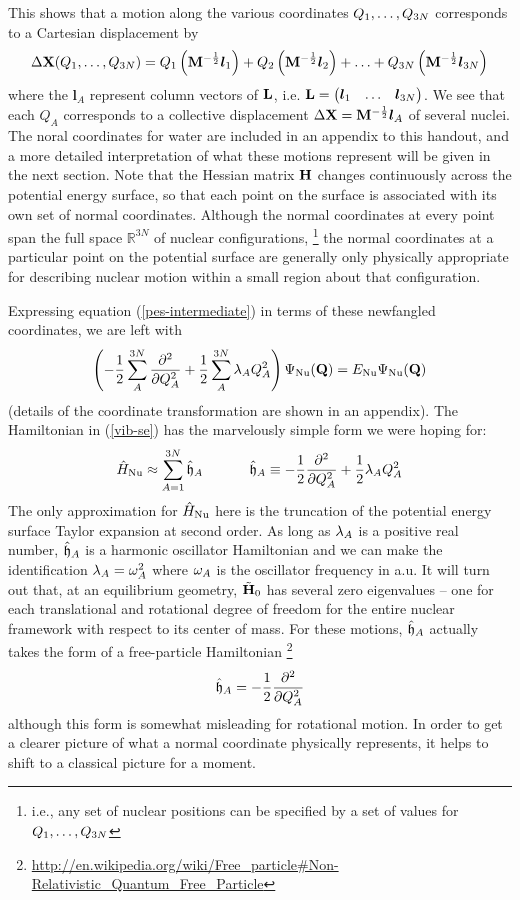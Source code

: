 \documentclass[11pt]{article}
\begin{document}
This shows that a motion along the various coordinates $Q_1,\ldots,Q_{3N}$ corresponds to a Cartesian displacement by
\begin{align}
%
	\D\bo{X}(Q_1,\ld,Q_{3N})
=
%
	Q_1\pr{\bo{M}^{-\frac{1}{2}}\bm{l}_1}
+
	Q_2\pr{\bo{M}^{-\frac{1}{2}}\bm{l}_2}
+
	\ld
+
	Q_{3N}\pr{\bo{M}^{-\frac{1}{2}}\bm{l}_{3N}}
\end{align}
where the $\bm{l}_A$ represent column vectors of $\mathbf{L}$, i.e. $\mathbf{L}=\left(\begin{matrix}\bm{l}_1&\ldots&\bm{l}_{3N}\end{matrix}\right)$.
We see that each $Q_A$ corresponds to a collective displacement $\Delta\mathbf{X}=\mathbf{M}^{-\frac{1}{2}}\bm{l}_A$ of several nuclei.
The noral coordinates for water are included in an appendix to this handout, and a more detailed interpretation of what these motions represent will be given in the next section.
Note that the Hessian matrix $\mathbf{H}$ changes continuously across the potential energy surface, so that each point on the surface is associated with its own set of normal coordinates.
Although the normal coordinates at every point span the full space $\mathbb{R}^{3N}$ of nuclear configurations, \footnote{i.e., any set of nuclear positions can be specified by a set of values for $Q_1,\ldots,Q_{3N}$} the normal coordinates at a particular point on the potential surface are generally only physically appropriate for describing nuclear motion within a small region about that configuration.

Expressing equation (\ref{pes-intermediate}) in terms of these newfangled coordinates, we are left with 
\begin{align}
\label{vib-se}
\left(
-\dfrac{1}{2}\sum_A^{3N}
	 \dfrac{ \partial^{2}  }{\partial Q_A ^{2}}
+\dfrac{1}{2}\sum_A^{3N}
	\lambda_A Q_A^2
\right)
	\Psi_{\mathrm{Nu}}(\mathbf{Q})
=
	E_{\mathrm{Nu}}
	\Psi_{\mathrm{Nu}}(\mathbf{Q})
\end{align}
(details of the coordinate transformation are shown in an appendix).
The Hamiltonian in (\ref{vib-se}) has the marvelously simple form we were hoping for:
\begin{align}
\label{harm-hamiltonian}
%
	\op{H}_\Nu
\approx
	\sum_{A=1}^{3N}
	\op{\mf{h}}_A
\sp
%
	\op{\mf{h}}_A
\equiv
-\fr{1}{2}
	\pd{2}{}{Q_A}
+\fr{1}{2}
	\la_A Q_A^2
\end{align}
The only approximation for $\hat{H}_{\mathrm{Nu}}$ here is the truncation of the potential energy surface Taylor expansion at second order.
As long as $\lambda_A$ is a positive real number, $\hat{\mathfrak{h}}_A$ is a harmonic oscillator Hamiltonian and we can make the identification $\lambda_A=\omega_A^2$ where $\omega_A$ is the oscillator frequency in a.u.
It will turn out that, at an equilibrium geometry, $\tilde{\mathbf{H}}_0$ has several zero eigenvalues -- one for each translational and rotational degree of freedom for the entire nuclear framework with respect to its center of mass.
For these motions, $\hat{\mathfrak{h}}_A$ actually takes the form of a free-particle Hamiltonian \footnote{\url{http://en.wikipedia.org/wiki/Free_particle\#Non-Relativistic_Quantum_Free_Particle}}
\begin{align}
%
	\op{\mf{h}}_A
=
-\fr{1}{2}
	\pd{2}{}{Q_A}
\end{align}
although this form is somewhat misleading for rotational motion.
In order to get a clearer picture of what a normal coordinate physically represents, it helps to shift to a classical picture for a moment.
\end{document}
